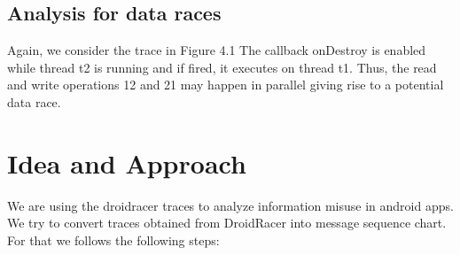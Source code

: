 \documentclass[11pt]{report}
\begin{document}
\section{Analysis for data races}
\par Again, we consider the trace in Figure 4.1 The callback onDestroy is  enabled  while  thread t2 is  running  and  if  fired,  it executes on thread t1. Thus, the read and
write operations 12 and 21 may happen in parallel giving rise to a potential data race.

\chapter{Idea and Approach}
\par We are using the droidracer traces to analyze information misuse in android apps.
We try to convert traces obtained from DroidRacer into message sequence chart. For that we follows the following steps:\\
\end{document}
